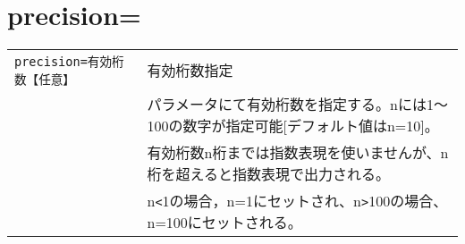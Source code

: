 
%

\section{precision=\label{sect:precision}}

\begin{table}[htbp]
{\small
\begin{tabular}{ll}
\verb|precision=有効桁数【任意】| & 有効桁数指定\\
& パラメータにて有効桁数を指定する。nには1～100の数字が指定可能[デフォルト値はn=10]。\\
& 有効桁数n桁までは指数表現を使いませんが、n桁を超えると指数表現で出力される。\\
& n\verb|<|1の場合，n=1にセットされ、n\verb|>|100の場合、n=100にセットされる。\\

\end{tabular} 
}
\end{table} 
%

